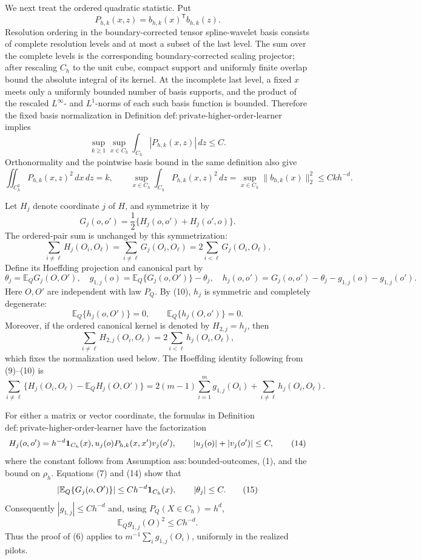 We next treat the ordered quadratic statistic.  Put
\[
 P_{h,k}(x,z)=b_{h,k}(x)^{\mathsf T}b_{h,k}(z).
\]
Resolution ordering in the boundary-corrected tensor spline-wavelet basis consists of complete resolution levels and at most a subset of the last level.  The sum over the complete levels is the corresponding boundary-corrected scaling projector; after rescaling \(C_h\) to the unit cube, compact support and uniformly finite overlap bound the absolute integral of its kernel.  At the incomplete last level, a fixed \(x\) meets only a uniformly bounded number of basis supports, and the product of the rescaled \(L^\infty\)- and \(L^1\)-norms of each such basis function is bounded.  Therefore the fixed basis normalization in Definition \(\mathrm{def{:}private\text{-}higher\text{-}order\text{-}learner}\) implies
\[
 \sup_{k\geq1}\sup_{x\in C_h}
 \int_{C_h}|P_{h,k}(x,z)|\,dz\leq C.
\tag{7}
\]
Orthonormality and the pointwise basis bound in the same definition also give
\[
 \iint_{C_h^2}P_{h,k}(x,z)^2\,dx\,dz=k,
 \qquad
 \sup_{x\in C_h}\int_{C_h}P_{h,k}(x,z)^2\,dz
 =\sup_{x\in C_h}\|b_{h,k}(x)\|_2^2
 \leq Ckh^{-d}.
\tag{8}
\]

Let \(H_j\) denote coordinate \(j\) of \(H\), and symmetrize it by
\[
 G_j(o,o')=\frac12\{H_j(o,o')+H_j(o',o)\}.
\]
The ordered-pair sum is unchanged by this symmetrization:
\[
 \sum_{i\ne \ell}H_j(O_i,O_\ell)
 =\sum_{i\ne \ell}G_j(O_i,O_\ell)
 =2\sum_{i<\ell}G_j(O_i,O_\ell).
\tag{9}
\]
Define its Hoeffding projection and canonical part by
\[
 \theta_j=\mathbb E_QG_j(O,O'),
 \quad g_{1,j}(o)=\mathbb E_Q\{G_j(o,O')\}-\theta_j,
 \quad h_j(o,o')=G_j(o,o')-\theta_j-g_{1,j}(o)-g_{1,j}(o').
\tag{10}
\]
Here \(O,O'\) are independent with law \(P_Q\).  By (10), \(h_j\) is symmetric and completely degenerate:
\[
 \mathbb E_Q\{h_j(o,O')\}=0,
 \qquad
 \mathbb E_Q\{h_j(O,o')\}=0.
\tag{11}
\]
Moreover, if the ordered canonical kernel is denoted by \(H_{2,j}=h_j\), then
\[
 \sum_{i\ne\ell}H_{2,j}(O_i,O_\ell)
 =2\sum_{i<\ell}h_j(O_i,O_\ell),
\tag{12}
\]
which fixes the normalization used below.  The Hoeffding identity following from (9)--(10) is
\[
 \sum_{i\ne\ell}\{H_j(O_i,O_\ell)-\mathbb E_QH_j(O,O')\}
 =2(m-1)\sum_{i=1}^m g_{1,j}(O_i)
  +\sum_{i\ne\ell}h_j(O_i,O_\ell).
\tag{13}
\]

For either a matrix or vector coordinate, the formulas in Definition \(\mathrm{def{:}private\text{-}higher\text{-}order\text{-}learner}\) have the factorization
\[
 H_j(o,o')=h^{-d}{\bf1}_{C_h}(x),u_j(o)
             P_{h,k}(x,x')v_j(o'),
 \qquad |u_j(o)|+|v_j(o')|\leq C,
\tag{14}
\]
where the constant follows from Assumption \(\mathrm{ass{:}bounded\text{-}outcomes}\), (1), and the bound on \(\rho_h\).  Equations (7) and (14) show that
\[
 |\mathbb E_Q\{G_j(o,O')\}|\leq Ch^{-d}{\bf1}_{C_h}(x),
 \qquad |\theta_j|\leq C.
\tag{15}
\]
Consequently \(|g_{1,j}|\leq Ch^{-d}\) and, using \(P_Q(X\in C_h)=h^d\),
\[
 \mathbb E_Qg_{1,j}(O)^2\leq Ch^{-d}.
\tag{16}
\]
Thus the proof of (6) applies to \(m^{-1}\sum_i g_{1,j}(O_i)\), uniformly in the realized pilots.

